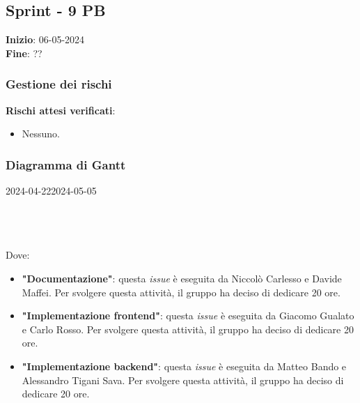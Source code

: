 \subsection{Sprint - 9 PB}
\textbf{Inizio}: 06-05-2024 \\
\textbf{Fine}: ??

\subsubsection{Gestione dei rischi}
\textbf{Rischi attesi verificati}:

\begin{itemize}
	\item Nessuno.
\end{itemize}

\subsubsection{Diagramma di Gantt}

\begin{ganttchart}[
		x unit=0.6cm, %
		y unit chart=0.6cm,
		bar/.style={fill=blue!50},
		bar height=0.5,
		time slot format=isodate,
		time slot unit=day,
		vgrid,
		today=2024-04-22,
		today rule/.style={draw=red, ultra thick}
	]{2024-04-22}{2024-05-05}
	 \\
	 \\
	 \\
	 \\
\end{ganttchart}

Dove:
\begin{itemize}
	\item \textbf{"Documentazione"}: questa \textit{issue} è eseguita da Niccolò Carlesso e Davide Maffei. Per svolgere questa attività, il gruppo ha deciso di dedicare 20 ore.
	\item \textbf{"Implementazione frontend"}: questa \textit{issue} è eseguita da Giacomo Gualato e Carlo Rosso. Per svolgere questa attività, il gruppo ha deciso di dedicare 20 ore.
	\item \textbf{"Implementazione backend"}: questa \textit{issue} è eseguita da Matteo Bando e Alessandro Tigani Sava. Per svolgere questa attività, il gruppo ha deciso di dedicare 20 ore.
\end{itemize}

